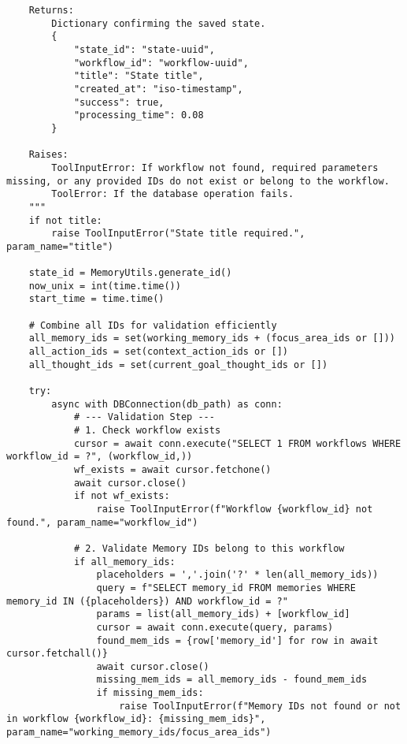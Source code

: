 \documentclass[12pt,a4paper]{article}
\begin{document}
\begin{pageablecode}
\begin{verbatim}
    Returns:
        Dictionary confirming the saved state.
        {
            "state_id": "state-uuid",
            "workflow_id": "workflow-uuid",
            "title": "State title",
            "created_at": "iso-timestamp",
            "success": true,
            "processing_time": 0.08
        }

    Raises:
        ToolInputError: If workflow not found, required parameters missing, or any provided IDs do not exist or belong to the workflow.
        ToolError: If the database operation fails.
    """
    if not title:
        raise ToolInputError("State title required.", param_name="title")

    state_id = MemoryUtils.generate_id()
    now_unix = int(time.time())
    start_time = time.time()

    # Combine all IDs for validation efficiently
    all_memory_ids = set(working_memory_ids + (focus_area_ids or []))
    all_action_ids = set(context_action_ids or [])
    all_thought_ids = set(current_goal_thought_ids or [])

    try:
        async with DBConnection(db_path) as conn:
            # --- Validation Step ---
            # 1. Check workflow exists
            cursor = await conn.execute("SELECT 1 FROM workflows WHERE workflow_id = ?", (workflow_id,))
            wf_exists = await cursor.fetchone()
            await cursor.close()
            if not wf_exists: 
                raise ToolInputError(f"Workflow {workflow_id} not found.", param_name="workflow_id")

            # 2. Validate Memory IDs belong to this workflow
            if all_memory_ids:
                placeholders = ','.join('?' * len(all_memory_ids))
                query = f"SELECT memory_id FROM memories WHERE memory_id IN ({placeholders}) AND workflow_id = ?"
                params = list(all_memory_ids) + [workflow_id]
                cursor = await conn.execute(query, params)
                found_mem_ids = {row['memory_id'] for row in await cursor.fetchall()}
                await cursor.close()
                missing_mem_ids = all_memory_ids - found_mem_ids
                if missing_mem_ids:
                    raise ToolInputError(f"Memory IDs not found or not in workflow {workflow_id}: {missing_mem_ids}", param_name="working_memory_ids/focus_area_ids")


\end{verbatim}
\end{pageablecode}
\end{document}
